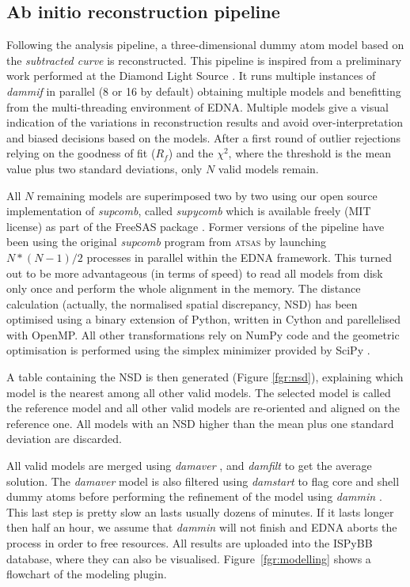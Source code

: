 \documentclass[preprint,pdf]{iucr}              %
\begin{document}
\subsection{Ab initio reconstruction pipeline}
\label{abinitio}
Following the analysis pipeline, a three-dimensional dummy atom model based
on the \textit{subtracted curve} is reconstructed.
This pipeline is inspired from a preliminary work
performed at the Diamond Light Source \cite{DiamondSE}.
It runs multiple instances of \textit{dammif} in parallel (8 or 16 by default)
obtaining multiple models \cite{dammif} and benefitting from 
the multi-threading environment of EDNA.
Multiple models give a visual indication of the variations in
reconstruction results and avoid over-interpretation and biased decisions
based on the models.
After a first round of outlier rejections relying on the goodness of fit
($R_{f}$) and the $\chi^{2}$, where the threshold is the mean value plus two
standard deviations, only $N$ valid models remain.

All $N$ remaining models are superimposed two by two using
our open source implementation of \textit{supcomb}, called
\textit{supycomb} which is available freely (MIT license) as part of the
FreeSAS package \cite{freesas}.
Former versions of the pipeline have been using the original
\textit{supcomb} \cite{supcomb} program from \textsc{atsas} by launching
$N*(N-1)/2$ processes in parallel within the EDNA framework.
This turned out to be more advantageous (in terms of speed) to read all models
from disk only once and perform the whole alignment in the memory.
The distance calculation (actually, the normalised spatial discrepancy, NSD)
has been optimised using a binary extension of Python, written in Cython
\cite{cython} and parellelised with OpenMP.
All other transformations rely on NumPy \cite{numpy} code and the geometric
optimisation is performed using the simplex minimizer provided by SciPy
\cite{scipy}.

A table containing the NSD is then generated
(Figure \ref{fgr:nsd}), explaining which model is the nearest among all
other valid models. 
The selected model is called the reference model and all other valid
models are re-oriented and aligned on the reference one.
All models with an NSD higher than the mean plus one standard deviation are
discarded.

All valid models are merged using \textit{damaver} \cite{damaver},
and \textit{damfilt} to get the average solution. 
The \textit{damaver} model is also filtered using \textit{damstart} to flag
core and shell dummy atoms before performing the refinement of the model using
\textit{dammin} \cite{dammin}.
This last step is pretty slow an lasts usually dozens of minutes. 
If it lasts longer then half an hour, we assume that \textit{dammin} will not finish and 
EDNA aborts the process in order to free resources. 
All results are uploaded into the ISPyBB database, where they can also be
visualised. 
Figure~\ref{fgr:modelling} shows a flowchart of the modeling plugin.
\end{document}
